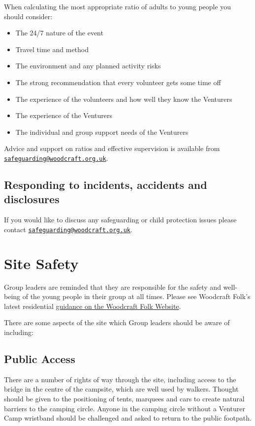 \documentclass[a4paper, 11pt]{report}
\newcommand{\nl}{\newline}
\begin{document}
When calculating the most appropriate ratio of adults to young people you should consider:
\begin{itemize}
    \item The 24/7 nature of the event
    \item Travel time and method
    \item The environment and any planned activity risks
    \item The strong recommendation that every volunteer gets some time off
    \item The experience of the volunteers and how well they know the Venturers
    \item The experience of the Venturers
    \item The individual and group support needs of the Venturers
\end{itemize}
Advice and support on ratios and effective supervision is available from \href{mailto:safeguarding@woodcraft.org.uk}{\texttt{safeguarding@woodcraft.org.uk}}.

\section{Responding to incidents, accidents and disclosures}
If you would like to discuss any safeguarding or child protection issues please contact \href{mailto:safeguarding@woodcraft.org.uk}{\texttt{safeguarding@woodcraft.org.uk}}.

\chapter{Site Safety}
Group leaders are reminded that they are responsible for the safety and well-being of the young people in their group at all times. Please see Woodcraft Folk's latest residential \href{https://woodcraft.org.uk/group-guidance/camping-and-residentials/}{guidance on the Woodcraft Folk Website}. \nl

There are some aspects of the site which Group leaders should be aware of including:
\section{Public Access}
There are a number of rights of way through the site, including access to the bridge in the centre of the campsite, which are well used by walkers. Thought should be given to the positioning of tents, marquees and cars to create natural barriers to the camping circle. Anyone in the camping circle without a Venturer Camp wristband should be challenged and asked to return to the public footpath.
\end{document}

